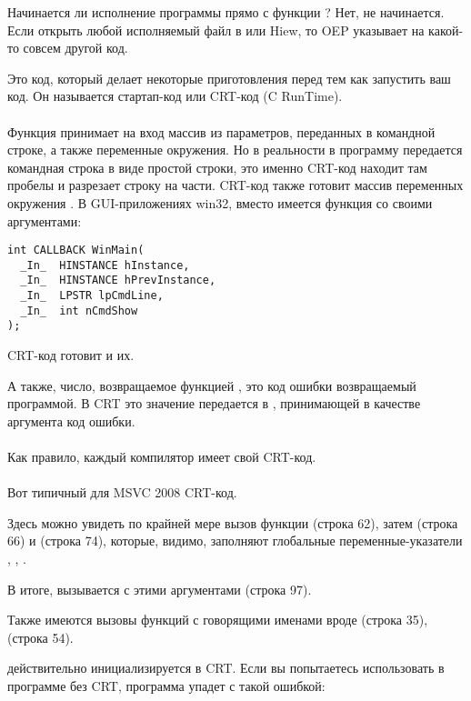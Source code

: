 \label{sec:CRT}

Начинается ли исполнение программы прямо с функции \main{}?
Нет, не начинается.
Если открыть любой исполняемый файл в \IDA или Hiew, 
то \ac{OEP} указывает на какой-то совсем другой код.

Это код, который делает некоторые приготовления перед тем как запустить ваш код.
Он называется стартап-код или CRT-код (C RunTime). \\
\\
Функция \main{} принимает на вход массив из параметров, переданных в командной строке, а также
переменные окружения.
Но в реальности в программу передается командная строка в виде простой строки, это именно
CRT-код находит там пробелы и разрезает строку на части.
CRT-код также готовит массив переменных окружения .
В \ac{GUI}-приложениях win32, вместо \main{} имеется функция  со своими аргументами:

\begin{lstlisting}
int CALLBACK WinMain(
  _In_  HINSTANCE hInstance,
  _In_  HINSTANCE hPrevInstance,
  _In_  LPSTR lpCmdLine,
  _In_  int nCmdShow
);
\end{lstlisting}

CRT-код готовит и их.

А также, число, возвращаемое функцией \main{}, это код ошибки возвращаемый программой.
В CRT это значение передается в , принимающей в качестве аргумента код ошибки. \\
\\
Как правило, каждый компилятор имеет свой CRT-код. \\
\\
Вот типичный для MSVC 2008 CRT-код.



Здесь можно увидеть по крайней мере вызов
функции  (строка 62), 
затем  (строка 66) и  (строка 74),
которые, видимо, заполняют глобальные переменные-указатели
, , .

В итоге, вызывается \main{} с этими аргументами (строка 97).

Также имеются вызовы функций с говорящими именами вроде  (строка 35),  (строка 54).

 действительно инициализируется в \ac{CRT}.
Если вы попытаетесь использовать  в программе без CRT, программа упадет с такой ошибкой:

